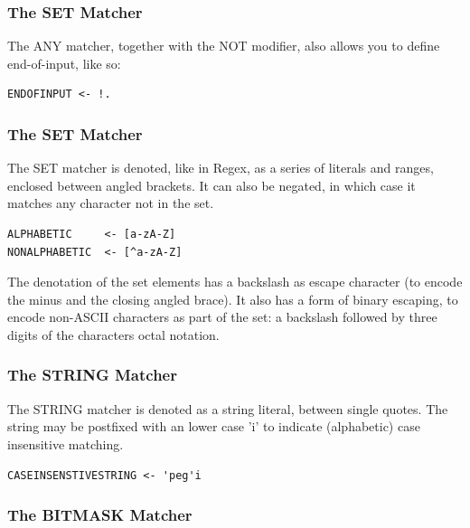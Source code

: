 \subsubsection{The SET Matcher}

The ANY matcher, together with the NOT modifier,
also allows you to define end-of-input, like so:

\begin{myquote}
\begin{verbatim}
ENDOFINPUT <- !.
\end{verbatim}
\end{myquote}

\subsubsection{The SET Matcher}

The SET matcher is denoted, like in Regex, as a series of literals
and ranges, enclosed between angled brackets. It can also be negated,
in which case it matches any character not in the set.

\begin{myquote}
\begin{verbatim}
ALPHABETIC     <- [a-zA-Z]
NONALPHABETIC  <- [^a-zA-Z]
\end{verbatim}
\end{myquote}

The denotation of the set elements has a backslash as escape character
(to encode the minus and the closing angled brace).
It also has a form of binary escaping, to encode non-ASCII characters
as part of the set: a backslash followed by three digits of the characters
octal notation.

\subsubsection{The STRING Matcher}

The STRING matcher is denoted as a string literal, between single
quotes. The string may be postfixed with an lower case 'i' to
indicate (alphabetic) case insensitive matching.

\begin{myquote}
\begin{verbatim}
CASEINSENSTIVESTRING <- 'peg'i
\end{verbatim}
\end{myquote}

\subsubsection{The BITMASK Matcher}

